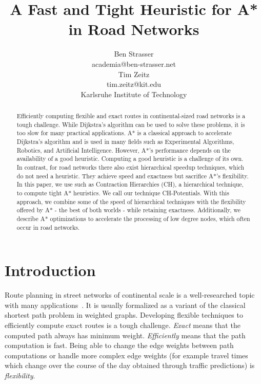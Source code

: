 \documentclass[letterpaper]{article} %
\title{A Fast and Tight Heuristic for A* in Road Networks}
\author{Ben Strasser\\
academia@ben-strasser.net\\
\And
Tim Zeitz\\
tim.zeitz@kit.edu\\
Karlsruhe Institute of Technology
}
\begin{document}
\maketitle


\begin{abstract}
Efficiently computing flexible and exact routes in continental-sized road networks is a tough challenge.
While Dijkstra's algorithm can be used to solve these problems, it is too slow for many practical applications.
A* is a classical approach to accelerate Dijkstra's algorithm and is used in many fields such as Experimental Algorithms, Robotics, and Artificial Intelligence.
However, A*'s performance depends on the availability of a good heuristic.
Computing a good heuristic is a challenge of its own.
In contrast, for road networks there also exist hierarchical speedup techniques, which do not need a heuristic.
They achieve speed and exactness but sacrifice A*'s flexibility.
In this paper, we use such as Contraction Hierarchies (CH), a hierarchical technique, to compute tight A* heuristics.
We call our technique CH-Potentials.
With this approach, we combine some of the speed of hierarchical techniques with the flexibility offered by A* - the best of both worlds - while retaining exactness.
Additionally, we describe A* optimizations to accelerate the processing of low degree nodes, which often occur in road networks.
\end{abstract}

\section{Introduction}
\label{sec:intro}
Route planning in street networks of continental scale is a well-researched topic with many applications~\cite{bdgmpsww-rptn-16}.
It is usually formalized as a variant of the classical shortest path problem in weighted graphs.
Developing flexible techniques to efficiently compute exact routes is a tough challenge.
\emph{Exact} means that the computed path always has minimum weight.
\emph{Efficiently} means that the path computation is fast.
Being able to change the edge weights between path computations or handle more complex edge weights (for example travel times which change over the course of the day obtained through traffic predictions) is \emph{flexibility}.
\end{document}
